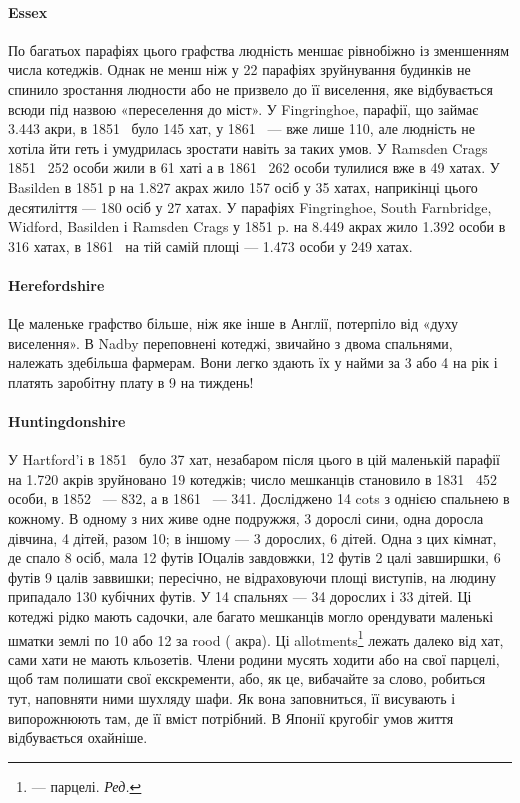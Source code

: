 \paragraph{Essex}

По багатьох парафіях цього графства людність меншає рівнобіжно
із зменшенням числа котеджів. Однак не менш ніж у
22 парафіях зруйнування будинків не спинило зростання людности
або не призвело до її виселення, яке відбувається всюди під
назвою «переселення до міст». У Fingringhoe, парафії, що займає
\num{3.443} акри, в 1851~ було 145 хат, у 1861~ — вже лише 110, але
людність не хотіла йти геть і умудрилась зростати навіть за
таких умов. У Ramsden Crags 1851~ 252 особи жили в 61 хаті
а в 1861~ 262 особи тулилися вже в 49 хатах. У Basilden в 1851 р
на \num{1.827} акрах жило 157 осіб у 35 хатах, наприкінці цього десятиліття
— 180 осіб у 27 хатах. У парафіях Fingringhoe, South
Farnbridge, Widford, Basilden і Ramsden Crags у 1851 p. на
\num{8.449} акрах жило \num{1.392} особи в 316 хатах, в 1861~ на тій самій
площі — \num{1.473} особи у 249 хатах.

\paragraph{Herefordshire}

Це маленьке графство більше, ніж яке інше в Англії, потерпіло
від «духу виселення». В Nadby переповнені котеджі,
звичайно з двома спальнями, належать здебільша фармерам.
Вони легко здають їх у найми за 3 або 4 на рік
і платять заробітну плату в 9 на тиждень!

\paragraph{Huntingdonshire}

У Hartford’i в 1851~ було 37 хат, незабаром після цього
в цій маленькій парафії на \num{1.720} акрів зруйновано 19 котеджів;
число мешканців становило в 1831~ 452 особи, в 1852~ — 832,
а в 1861~ — 341. Досліджено 14 cots з однією спальнею в кожному.
В одному з них живе одне подружжя, 3 дорослі сини, одна
доросла дівчина, 4 дітей, разом 10; в іншому — 3 дорослих,
6 дітей. Одна з цих кімнат, де спало 8 осіб, мала 12 футів ІОцалів
завдовжки, 12 футів 2 цалі завширшки, 6 футів 9 цалів заввишки;
пересічно, не відраховуючи площі виступів, на людину припадало
130 кубічних футів. У 14 спальнях — 34 дорослих і 33 дітей. Ці
котеджі рідко мають садочки, але багато мешканців могло орендувати
маленькі шматки землі по 10 або 12 за rood ( акра).
Ці allotments\footnote*{
— парцелі. \emph{Ред.}
} лежать далеко від хат, сами хати не мають кльозетів.
Члени родини мусять ходити або на свої парцелі, щоб там
полишати свої екскременти, або, як це, вибачайте за слово, робиться
тут, наповняти ними шухляду шафи. Як вона заповниться,
її висувають і випорожнюють там, де її вміст потрібний. В Японії
кругобіг умов життя відбувається охайніше.

